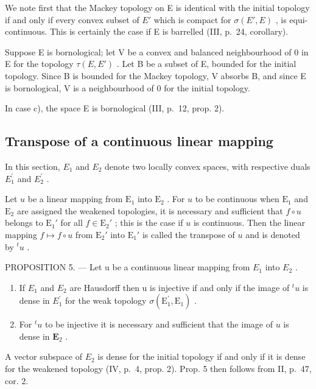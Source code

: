 We note first that the Mackey topology on E is identical with the initial topology if and only if every convex subset of \(E'\) which is compact for \(\sigma(E', E)\) , is equi-continuous. This is certainly the case if E is barrelled (III, p.~24, corollary).

Suppose E is bornological; let V be a convex and balanced neighbourhood of 0 in E for the topology \(\tau(E, E')\) . Let B be a subset of E, bounded for the initial topology. Since B is bounded for the Mackey topology, V absorbs B, and since E is bornological, V is a neighbourhood of 0 for the initial topology.

In case c), the space E is bornological (III, p.~12, prop. 2).

\subsection{Transpose of a continuous linear mapping}

In this section, \(E_{1}\) and \(E_{2}\) denote two locally convex spaces, with respective duals \(E_{1}^{\prime}\) and \(E_{2}^{\prime}\) .

Let \(u\) be a linear mapping from \(\mathrm{E}_1\) into \(\mathrm{E}_2\) . For \(u\) to be continuous when \(\mathrm{E}_1\) and \(\mathrm{E}_2\) are assigned the weakened topologies, it is necessary and sufficient that \(f \circ u\) belongs to \(\mathrm{E}_1'\) for all \(f \in \mathrm{E}_2'\) ; this is the case if \(u\) is continuous. Then the linear mapping \(f \mapsto f \circ u\) from \(\mathrm{E}_2'\) into \(\mathrm{E}_1'\) is called the transpose of \(u\) and is denoted by \(^t u\) .

PROPOSITION 5. --- Let u be a continuous linear mapping from \(E_{1}\) into \(E_{2}\) .

\begin{enumerate}
\def\labelenumi{(\roman{enumi})}
\item
  If \(E_{1}\) and \(E_{2}\) are Hausdorff then u is injective if and only if the image of \(^{t}u\) is dense in \(E_{1}^{\prime}\) for the weak topology \(\sigma(\mathrm{E}_{1}^{\prime},\mathrm{E}_{1})\) .
\item
  For \({}^{t}u\) to be injective it is necessary and sufficient that the image of \(u\) is dense in \(\mathbf{E}_2\) .
\end{enumerate}

A vector subspace of \(E_{2}\) is dense for the initial topology if and only if it is dense for the weakened topology (IV, p.~4, prop. 2). Prop. 5 then follows from II, p.~47, cor. 2.

